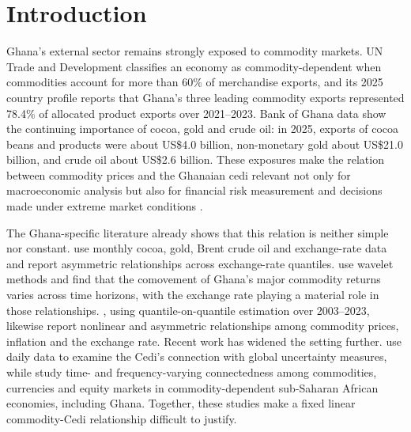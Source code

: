 \section{Introduction}
\label{sec:introduction}

Ghana's external sector remains strongly exposed to commodity markets. UN Trade and Development classifies an economy as commodity-dependent when commodities account for more than 60\% of merchandise exports, and its 2025 country profile reports that Ghana's three leading commodity exports represented 78.4\% of allocated product exports over 2021--2023. Bank of Ghana data show the continuing importance of cocoa, gold and crude oil: in 2025, exports of cocoa beans and products were about US\$4.0 billion, non-monetary gold about US\$21.0 billion, and crude oil about US\$2.6 billion. These exposures make the relation between commodity prices and the Ghanaian cedi relevant not only for macroeconomic analysis but also for financial risk measurement and decisions made under extreme market conditions \citep{unctad2025,bog2025}.

The Ghana-specific literature already shows that this relation is neither simple nor constant. \citet{archer2022} use monthly cocoa, gold, Brent crude oil and exchange-rate data and report asymmetric relationships across exchange-rate quantiles. \citet{barson2023} use wavelet methods and find that the comovement of Ghana's major commodity returns varies across time horizons, with the exchange rate playing a material role in those relationships. \citet{yeboah2025}, using quantile-on-quantile estimation over 2003--2023, likewise report nonlinear and asymmetric relationships among commodity prices, inflation and the exchange rate. Recent work has widened the setting further. \citet{atipaga2025} use daily data to examine the Cedi's connection with global uncertainty measures, while \citet{woode2025} study time- and frequency-varying connectedness among commodities, currencies and equity markets in commodity-dependent sub-Saharan African economies, including Ghana. Together, these studies make a fixed linear commodity-Cedi relationship difficult to justify.

